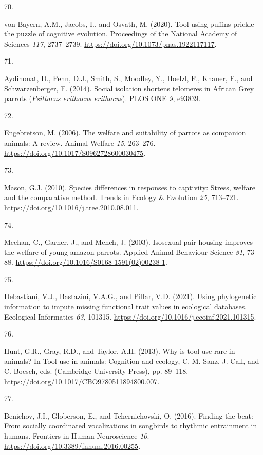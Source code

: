 \documentclass[
  man, donotrepeattitle,floatsintext]{apa6}
\newlength{\cslhangindent}
\newlength{\csllabelwidth}
\newlength{\cslentryspacingunit} %
\newenvironment{CSLReferences}[2] %
 {%
  \setlength{\parindent}{0pt}
  \ifodd #1
  \let\oldpar\par
  \def\par{\hangindent=\cslhangindent\oldpar}
  \fi
  \setlength{\parskip}{#2\cslentryspacingunit}
 }%
 {}
\newcommand{\CSLLeftMargin}[1]{\parbox[t]{\csllabelwidth}{#1}}
\newcommand{\CSLRightInline}[1]{\parbox[t]{\linewidth - \csllabelwidth}{#1}\break}
\begin{document}
\begin{CSLReferences}{0}{0}
\leavevmode{}%
\CSLLeftMargin{70. }%
\CSLRightInline{von Bayern, A.M., Jacobs, I., and Osvath, M. (2020). Tool-using puffins prickle the puzzle of cognitive evolution. Proceedings of the National Academy of Sciences \emph{117}, 2737--2739. \url{https://doi.org/10.1073/pnas.1922117117}.}

\leavevmode{}%
\CSLLeftMargin{71. }%
\CSLRightInline{Aydinonat, D., Penn, D.J., Smith, S., Moodley, Y., Hoelzl, F., Knauer, F., and Schwarzenberger, F. (2014). Social isolation shortens telomeres in {A}frican {G}rey parrots (\emph{{P}sittacus erithacus erithacus}). PLOS ONE \emph{9}, e93839.}

\leavevmode{}%
\CSLLeftMargin{72. }%
\CSLRightInline{Engebretson, M. (2006). The welfare and suitability of parrots as companion animals: A review. Animal Welfare \emph{15}, 263--276. \url{https://doi.org/10.1017/S0962728600030475}.}

\leavevmode{}%
\CSLLeftMargin{73. }%
\CSLRightInline{Mason, G.J. (2010). Species differences in responses to captivity: Stress, welfare and the comparative method. Trends in Ecology \& Evolution \emph{25}, 713--721. \url{https://doi.org/10.1016/j.tree.2010.08.011}.}

\leavevmode{}%
\CSLLeftMargin{74. }%
\CSLRightInline{Meehan, C., Garner, J., and Mench, J. (2003). Isosexual pair housing improves the welfare of young amazon parrots. Applied Animal Behaviour Science \emph{81}, 73--88. \url{https://doi.org/10.1016/S0168-1591(02)00238-1}.}

\leavevmode{}%
\CSLLeftMargin{75. }%
\CSLRightInline{Debastiani, V.J., Bastazini, V.A.G., and Pillar, V.D. (2021). Using phylogenetic information to impute missing functional trait values in ecological databases. Ecological Informatics \emph{63}, 101315. \url{https://doi.org/10.1016/j.ecoinf.2021.101315}.}

\leavevmode{}%
\CSLLeftMargin{76. }%
\CSLRightInline{Hunt, G.R., Gray, R.D., and Taylor, A.H. (2013). Why is tool use rare in animals? In Tool use in animals: Cognition and ecology, C. M. Sanz, J. Call, and C. Boesch, eds. (Cambridge University Press), pp. 89--118. \url{https://doi.org/10.1017/CBO9780511894800.007}.}

\leavevmode{}%
\CSLLeftMargin{77. }%
\CSLRightInline{Benichov, J.I., Globerson, E., and Tchernichovski, O. (2016). Finding the beat: From socially coordinated vocalizations in songbirds to rhythmic entrainment in humans. Frontiers in Human Neuroscience \emph{10}. \url{https://doi.org/10.3389/fnhum.2016.00255}.}


\end{CSLReferences}
\end{document}

